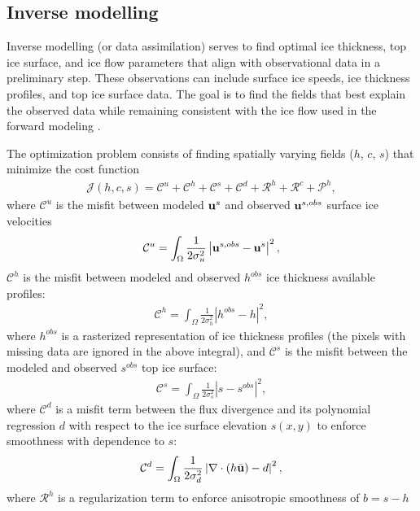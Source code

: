 \documentclass[10pt,twocolumn]{article}
\begin{document}
 
\subsection{Inverse modelling}
\label{inv_model} 

Inverse modelling (or data assimilation) serves to find optimal ice thickness, 
top ice surface, and ice flow parameters that align with observational data in a preliminary step.
These observations can include surface ice speeds, ice thickness profiles, and top ice surface data. 
The goal is to find the fields that best explain the observed data while 
remaining consistent with the ice flow used in the forward modeling \citep{jouvet2023inversion}.
  
The optimization problem consists of finding spatially varying fields 
($h$, $c$, $s$) that minimize the cost function
\begin{align}
\mathcal{J}(h,c,s)=\mathcal{C}^u+\mathcal{C}^h+\mathcal{C}^s
+\mathcal{C}^{d}+\mathcal{R}^h+\mathcal{R}^{c}+\mathcal{P}^h,
\end{align}
where $\mathcal{C}^u$ is the misfit between modeled ${\bf u}^{s}$ and observed 
${\bf u}^{s,obs}$ surface ice velocities 
\begin{align}
\mathcal{C}^u=\int_{\Omega}\frac{1}{2\sigma_u^2}\left|{\bf u}^{s,obs}-{\bf u}^{s}\right|^2,
\end{align} 
$\mathcal{C}^h$ is the misfit between modeled and observed $h^{obs}$ ice thickness available profiles:
\begin{align}
\mathcal{C}^h= \int_{\Omega}\frac{1}{2 \sigma_h^2}|h^{obs} -h |^2,
\end{align}
where $h^{obs}$ is a rasterized representation of ice thickness profiles
(the pixels with missing data are ignored in the above integral), and
$\mathcal{C}^s$ is the misfit between the modeled and observed $s^{obs}$ top ice surface:
\begin{align}
\mathcal{C}^s=\int_{\Omega}\frac{1}{2 \sigma_s^2}\left|s-s^{obs}\right|^2,
\end{align}
where $\mathcal{C}^{d}$ is a misfit term between the flux divergence and its polynomial 
regression $d$ with respect to the ice surface elevation $s(x,y)$ to enforce smoothness 
with  dependence to $s$:
\begin{align}
\mathcal{C}^{d}=\int_{\Omega}\frac{1}{2 \sigma_d^2}\left|\nabla \cdot (h {\bar{\bf u}})-d \right|^2,
\end{align}
where $\mathcal{R}^h$ is a regularization term to enforce anisotropic smoothness of $b=s-h$
\end{document}
